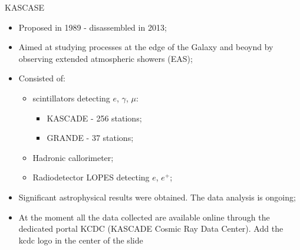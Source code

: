 \begin{frame}{KASCASE}
\begin{itemize}
 \item Proposed in 1989 - disassembled in 2013;
 \item Aimed at studying processes at the edge of the Galaxy and beoynd by observing extended atmospheric showers (EAS);
 \item Consisted of: 
 \begin{itemize}
  \item scintillators detecting $e$, $\gamma$, $\mu$:
 \begin{itemize}
    \item KASCADE - 256 stations;
    \item GRANDE - 37 stations; 
 \end{itemize}
    \item Hadronic callorimeter;
    \item Radiodetector LOPES detecting $e$, $e^{+}$;
 \end{itemize}
  \item Significant astrophysical results were obtained. The data analysis is ongoing;
  \item At the moment all the data collected are available online through the dedicated portal KCDC (KASCADE Cosmic Ray Data Center).
\textcolor{red!50!black}{Add the kcdc logo in the center of the slide}
\end{itemize}
 
\end{frame}


